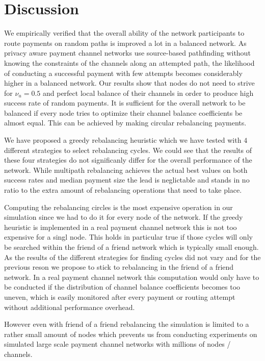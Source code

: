 \documentclass[a4paper]{paper}
\begin{document}
\section{Discussion}
\label{sec:conclusion}
We empirically verified that the overall ability of the network participants to route payments on random paths is improved a lot in a balanced network. 
As privacy aware payment channel networks use source-based pathfinding without knowing the constraints of the channels along an attempted path, the likelihood of conducting a successful payment with few attempts becomes considerably higher in a balanced network.
Our results show that nodes do not need to strive for $\nu_u = 0.5$ and perfect local balance of their channels in order to produce high success rate of random payments.
It is sufficient for the overall network to be balanced if every node tries to optimize their channel balance coefficients be almost equal. 
This can be achieved by making circular rebalancing payments.

We have proposed a greedy rebalancing heuristic which we have tested with $4$ different strategies to select rebalancing cycles.
We could see that the results of these four strategies do not significanly differ for the overall performance of the network.
While multipath rebalancing achieves the actual best values on both success rates and median payment size the lead is neglictable and stands in no ratio to the extra amount of rebalancing operations that need to take place.

Computing the rebalancing circles is the most expensive operation in our simulation since we had to do it for every node of the network.
If the greedy heuristic is implemented in a real payment channel network this is not too expensive for a singl node.
This holds in particular true if those cycles will only be searched within the friend of a friend network which is typically small enough.
As the results of the different strategies for finding cycles did not vary and for the previous reson we propose to stick to rebalancing in the friend of a friend network.
In a real payment channel network this computation would only have to be conducted 
if the distribution of channel balance coefficients becomes too uneven,
which is easily monitored after every payment or routing attempt without additional performance overhead.

However even with friend of a friend rebalancing the simulation is limited to a rather small amount of nodes which prevents us from conducting experiments on simulated large scale payment channel networks with millions of nodes / channels.
\end{document}
